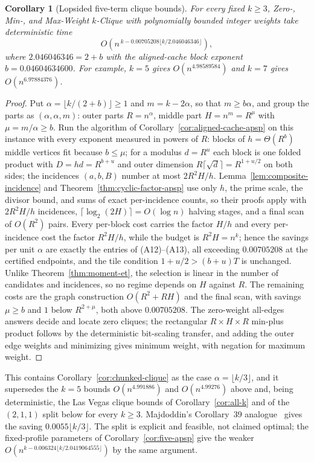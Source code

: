 \documentclass[11pt]{article}
\newtheorem{corollary}[theorem]{Corollary}
\begin{document}
\begin{corollary}[Lopsided five-term clique bounds]
\label{cor:lopsided-five-clique}
For every fixed $k\ge3$, Zero-, Min-, and Max-Weight $k$-Clique with
polynomially bounded integer weights take deterministic time
\[
O\!\left(n^{\,k-0.00705208\lfloor k/2.046046346\rfloor}\right),
\]
where $2.046046346=2+b$ with the aligned-cache block exponent
$b=0.04604634600$. For example, $k=5$ gives $O(n^{4.98589584})$ and
$k=7$ gives $O(n^{6.97884376})$.
\end{corollary}
\begin{proof}
Put $\alpha=\lfloor k/(2+b)\rfloor\ge1$ and $m=k-2\alpha$, so that
$m\ge b\alpha$, and group the parts as $(\alpha,\alpha,m)$: outer parts
$R=n^\alpha$, middle part $H=n^m=R^\mu$ with $\mu=m/\alpha\ge b$.
Run the algorithm of Corollary~\ref{cor:aligned-cache-apsp} on this
instance with every exponent measured in powers of $R$: blocks of
$h=\Theta(R^b)$ middle vertices fit because $b\le\mu$; for a modulus
$d=R^u$ each block is one folded product with $D=hd=R^{b+u}$ and outer
dimension $R\lceil\sqrt d\rceil=R^{1+u/2}$ on both sides; the incidences
$(a,b,B)$ number at most $2R^2H/h$. Lemma~\ref{lem:composite-incidence}
and Theorem~\ref{thm:cyclic-factor-apsp} use only $h$, the prime scale,
the divisor bound, and sums of exact per-incidence counts, so their
proofs apply with $2R^2H/h$ incidences, $\lceil\log_2(2H)\rceil=O(\log n)$
halving stages, and a final scan of $O(R^2)$ pairs. Every per-block cost
carries the factor $H/h$ and every per-incidence cost the factor
$R^2H/h$, while the budget is $R^2H=n^k$; hence the savings per unit
$\alpha$ are exactly the entries of (A12)--(A13), all exceeding
$0.00705208$ at the certified endpoints, and the tile condition
$1+u/2>(b+u)T$ is unchanged. Unlike Theorem~\ref{thm:moment-et}, the
selection is linear in the number of candidates and incidences, so no
regime depends on $H$ against $R$. The remaining costs are the graph
construction $O(R^2+RH)$ and the final scan, with savings $\mu\ge b$ and
$1$ below $R^{2+\mu}$, both above $0.00705208$. The zero-weight all-edges
answers decide and locate zero cliques; the rectangular $R\times H\times R$
min-plus product follows by the deterministic bit-scaling transfer, and
adding the outer edge weights and minimizing gives minimum weight, with
negation for maximum weight.
\end{proof}
This contains Corollary~\ref{cor:chunked-clique} as the case
$\alpha=\lfloor k/3\rfloor$, and it supersedes the $k=5$ bounds
$O(n^{4.991886})$ and $O(n^{4.99276})$ above and, being deterministic, the
Las Vegas clique bounds of Corollary~\ref{cor:all-k} and of the $(2,1,1)$
split below for every $k\ge3$. Majdoddin's Corollary~39
analogue~\cite{M26} gives the saving $0.0055\lfloor k/3\rfloor$. The split
is explicit and feasible, not claimed optimal; the fixed-profile parameters
of Corollary~\ref{cor:five-apsp} give the weaker
$O(n^{k-0.006324\lfloor k/2.0419064555\rfloor})$ by the same argument.
\end{document}
